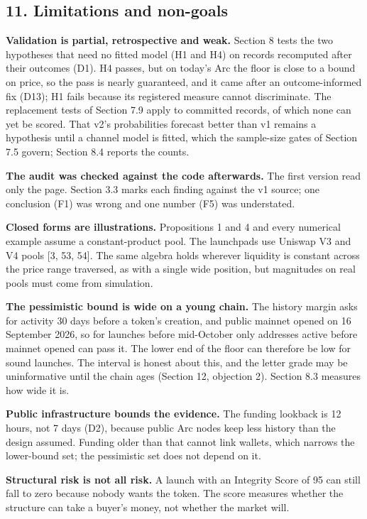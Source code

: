 \subsection{11. Limitations and non-goals}\label{limitations-and-non-goals}

\textbf{Validation is partial, retrospective and weak.} Section 8 tests the two hypotheses that need no fitted model (H1 and H4) on records recomputed after their outcomes (D1). H4 passes, but on today's Arc the floor is close to a bound on price, so the pass is nearly guaranteed, and it came after an outcome-informed fix (D13); H1 fails because its registered measure cannot discriminate. The replacement tests of Section 7.9 apply to committed records, of which none can yet be scored. That v2's probabilities forecast better than v1 remains a hypothesis until a channel model is fitted, which the sample-size gates of Section 7.5 govern; Section 8.4 reports the counts.

\textbf{The audit was checked against the code afterwards.} The first version read only the page. Section 3.3 marks each finding against the v1 source; one conclusion (F1) was wrong and one number (F5) was understated.

\textbf{Closed forms are illustrations.} Propositions 1 and 4 and every numerical example assume a constant-product pool. The launchpads use Uniswap V3 and V4 pools {[}3, 53, 54{]}. The same algebra holds wherever liquidity is constant across the price range traversed, as with a single wide position, but magnitudes on real pools must come from simulation.

\textbf{The pessimistic bound is wide on a young chain.} The history margin asks for activity 30 days before a token's creation, and public mainnet opened on 16 September 2026, so for launches before mid-October only addresses active before mainnet opened can pass it. The lower end of the floor can therefore be low for sound launches. The interval is honest about this, and the letter grade may be uninformative until the chain ages (Section 12, objection 2). Section 8.3 measures how wide it is.

\textbf{Public infrastructure bounds the evidence.} The funding lookback is 12 hours, not 7 days (D2), because public Arc nodes keep less history than the design assumed. Funding older than that cannot link wallets, which narrows the lower-bound set; the pessimistic set does not depend on it.

\textbf{Structural risk is not all risk.} A launch with an Integrity Score of 95 can still fall to zero because nobody wants the token. The score measures whether the structure can take a buyer's money, not whether the market will.

